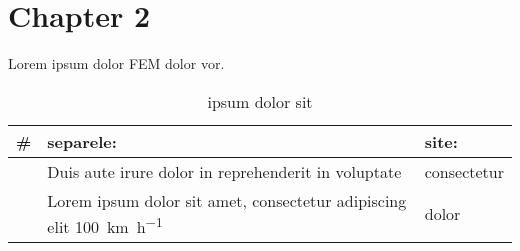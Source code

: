 \documentclass[../main.tex]{subfiles}
\begin{document}
\section{Chapter 2}
Lorem ipsum dolor \gls{FEM} dolor  vor.
\lipsum[1]
\begin{table}[H]
	\centering
	\setcounter{magicrownumbers}{0}
	\begin{tabularx}{\textwidth}{p{0pt} X m{40mm}}
		\toprule
		\#         & \textbf{separele}:                                                             & \textbf{site}:      \\
		\midrule\morecmidrules\midrule
		\rownumber & Duis aute irure dolor in reprehenderit in voluptate                            & consectetur    \\
		\midrule
		\rownumber & Lorem ipsum dolor sit amet, consectetur adipiscing elit \SI{100}{\km\per\hour} & dolor \\
		\bottomrule
	\end{tabularx}
	\caption{ipsum dolor sit}
	\label{tab:sometablelabel}
\end{table}
\end{document}
